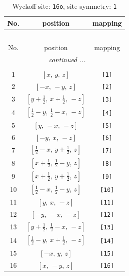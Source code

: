 \documentclass[fleqn,8pt]{jsarticle}
\begin{document}
\begin{longtable}{ccc}
\caption{Wyckoff site: {\tt 16o}, site symmetry: {\tt 1}}
 \\
 \hline \hline
No. & position & mapping \\ \hline \endfirsthead

\multicolumn{2}{l}{\tablename\ \thetable{}} \\
 \hline \hline
No. & position & mapping \\ \hline \endhead

 \hline \hline
\multicolumn{2}{r}{\footnotesize\it continued ...} \\ \endfoot

 \hline \hline
\multicolumn{2}{r}{} \\ \endlastfoot

1 & $\left[ x,\, y,\, z \right]$ & {\tt [1]} \\ \hline
2 & $\left[ - x,\, - y,\, z \right]$ & {\tt [2]} \\ \hline
3 & $\left[ y + \frac{1}{2},\, x + \frac{1}{2},\, - z \right]$ & {\tt [3]} \\ \hline
4 & $\left[ \frac{1}{2} - y,\, \frac{1}{2} - x,\, - z \right]$ & {\tt [4]} \\ \hline
5 & $\left[ y,\, - x,\, - z \right]$ & {\tt [5]} \\ \hline
6 & $\left[ - y,\, x,\, - z \right]$ & {\tt [6]} \\ \hline
7 & $\left[ \frac{1}{2} - x,\, y + \frac{1}{2},\, z \right]$ & {\tt [7]} \\ \hline
8 & $\left[ x + \frac{1}{2},\, \frac{1}{2} - y,\, z \right]$ & {\tt [8]} \\ \hline
9 & $\left[ x + \frac{1}{2},\, y + \frac{1}{2},\, z \right]$ & {\tt [9]} \\ \hline
10 & $\left[ \frac{1}{2} - x,\, \frac{1}{2} - y,\, z \right]$ & {\tt [10]} \\ \hline
11 & $\left[ y,\, x,\, - z \right]$ & {\tt [11]} \\ \hline
12 & $\left[ - y,\, - x,\, - z \right]$ & {\tt [12]} \\ \hline
13 & $\left[ y + \frac{1}{2},\, \frac{1}{2} - x,\, - z \right]$ & {\tt [13]} \\ \hline
14 & $\left[ \frac{1}{2} - y,\, x + \frac{1}{2},\, - z \right]$ & {\tt [14]} \\ \hline
15 & $\left[ - x,\, y,\, z \right]$ & {\tt [15]} \\ \hline
16 & $\left[ x,\, - y,\, z \right]$ & {\tt [16]} \\
\end{longtable}
\end{document}
